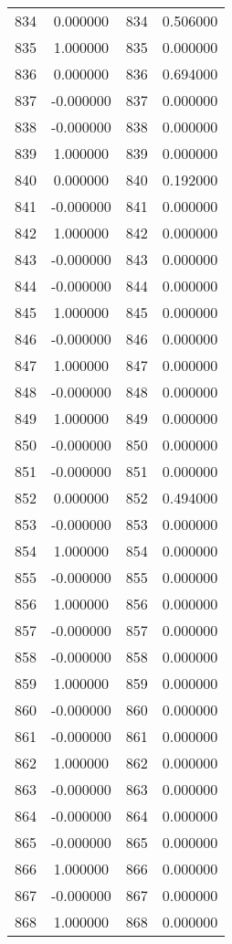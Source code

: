\documentclass[12pt]{article}
\begin{document}
\begin{longtable}{@{}cccc@{}}
834 & 0.000000 & 834 & 0.506000 \\
835 & 1.000000 & 835 & 0.000000 \\
836 & 0.000000 & 836 & 0.694000 \\
837 & -0.000000 & 837 & 0.000000 \\
838 & -0.000000 & 838 & 0.000000 \\
839 & 1.000000 & 839 & 0.000000 \\
840 & 0.000000 & 840 & 0.192000 \\
841 & -0.000000 & 841 & 0.000000 \\
842 & 1.000000 & 842 & 0.000000 \\
843 & -0.000000 & 843 & 0.000000 \\
844 & -0.000000 & 844 & 0.000000 \\
845 & 1.000000 & 845 & 0.000000 \\
846 & -0.000000 & 846 & 0.000000 \\
847 & 1.000000 & 847 & 0.000000 \\
848 & -0.000000 & 848 & 0.000000 \\
849 & 1.000000 & 849 & 0.000000 \\
850 & -0.000000 & 850 & 0.000000 \\
851 & -0.000000 & 851 & 0.000000 \\
852 & 0.000000 & 852 & 0.494000 \\
853 & -0.000000 & 853 & 0.000000 \\
854 & 1.000000 & 854 & 0.000000 \\
855 & -0.000000 & 855 & 0.000000 \\
856 & 1.000000 & 856 & 0.000000 \\
857 & -0.000000 & 857 & 0.000000 \\
858 & -0.000000 & 858 & 0.000000 \\
859 & 1.000000 & 859 & 0.000000 \\
860 & -0.000000 & 860 & 0.000000 \\
861 & -0.000000 & 861 & 0.000000 \\
862 & 1.000000 & 862 & 0.000000 \\
863 & -0.000000 & 863 & 0.000000 \\
864 & -0.000000 & 864 & 0.000000 \\
865 & -0.000000 & 865 & 0.000000 \\
866 & 1.000000 & 866 & 0.000000 \\
867 & -0.000000 & 867 & 0.000000 \\
868 & 1.000000 & 868 & 0.000000 \\

\end{longtable}
\end{document}
